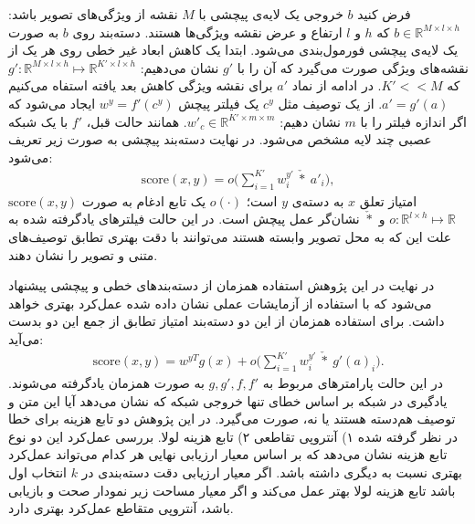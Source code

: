 فرض کنید $b$ خروجی یک لایه‌ی پیچشی با $M$ نقشه از ویژگی‌های تصویر باشد: $b \in \mathbb{R}^{M\times l \times h}$ که $h$ و $l$ ارتفاع و عرض نقشه ویژگی‌ها هستند. دسته‌بند روی $b$ به صورت یک لایه‌ی پیچشی فورمول‌بندی می‌شود. ابتدا یک کاهش ابعاد غیر خطی روی هر یک از نقشه‌های ویژگی صورت می‌گیرد که آن را با $g'$ نشان می‌دهیم:
$g': \mathbb{R}^{M\times l\times h} \mapsto \mathbb{R}^{K'\times l\times h}$
که
$K' << M$.
در ادامه از نماد  $a'$ برای نقشه ویژگی کاهش بعد یافته استفاه می‌کنیم
$a' = g'(a)$.
از یک توصیف مثل $c^y$ یک  فیلتر پیچش 
 $w^y = f'(c^y)$ ایجاد می‌شود که اگر اندازه فیلتر را با $m$ نشان دهیم: $w'_c \in \mathbb{R}^{K' \times m \times m}$. همانند حالت قبل، $f'$ با یک شبکه عصبی چند لایه مشخص می‌شود. در نهایت دسته‌بند پیچشی به صورت زیر تعریف می‌شود:
\begin{align}
\label{eq:conv}
\text{score}(x,y)=o\bigg(\sum_{i=1}^{K'}w^{y'}_{i}\  \check{*} \  a'_i\bigg),
\end{align}
 $\text{score}(x,y)$
  امتیاز تعلق $x$ به دسته‌ی $y$ است؛ $o(\cdot)$ یک تابع ادغام به صورت $o:\mathbb{R}^{l\times h} \mapsto \mathbb{R}$  و $\check{*}$ نشان‌گر عمل پیچش است. در این حالت فیلترهای یادگرفته شده به علت این که به محل تصویر وابسته هستند می‌توانند با دقت بهتری تطابق توصیف‌های متنی و تصویر را نشان دهند.

  در نهایت در این پژوهش استفاده همزمان از دسته‌بندهای خطی و پیچشی پیشنهاد می‌شود که با استفاده از آزمایشات عملی نشان داده شده عمل‌کرد بهتری خواهد داشت. برای استفاده همزمان از این دو دسته‌بند امتیاز تطابق از جمع این دو بدست می‌آید:
\begin{align}
\text{score}(x,y)=w^{yT}g(x) + o\bigg(\sum_{i=1}^{K'}w^{y'}_{i}\  \check{*} \  g'(a)_i\bigg).
\end{align}
در این حالت پارامترهای مربوط به $g, g', f , f'$ به صورت همزمان یادگرفته می‌شوند.
یادگیری در شبکه بر اساس خطای تنها خروجی شبکه که نشان می‌دهد آیا این متن و توصیف هم‌دسته هستند یا نه، صورت می‌گیرد. در این پژوهش دو تابع هزینه برای خطا در نظر گرفته شده ۱) آنتروپی تقاطعی
۲) تابع هزینه لولا. بررسی عمل‌کرد این دو نوع تابع هزینه نشان می‌دهد که بر اساس معیار ارزیابی نهایی هر کدام می‌تواند عمل‌کرد بهتری نسبت به دیگری داشته باشد. اگر معیار ارزیابی دقت دسته‌بندی در $k$ انتخاب اول باشد تابع هزینه لولا بهتر عمل می‌کند و اگر معیار مساحت زیر نمودار صحت و بازیابی باشد، آنتروپی متقاطع عمل‌کرد بهتری دارد.

